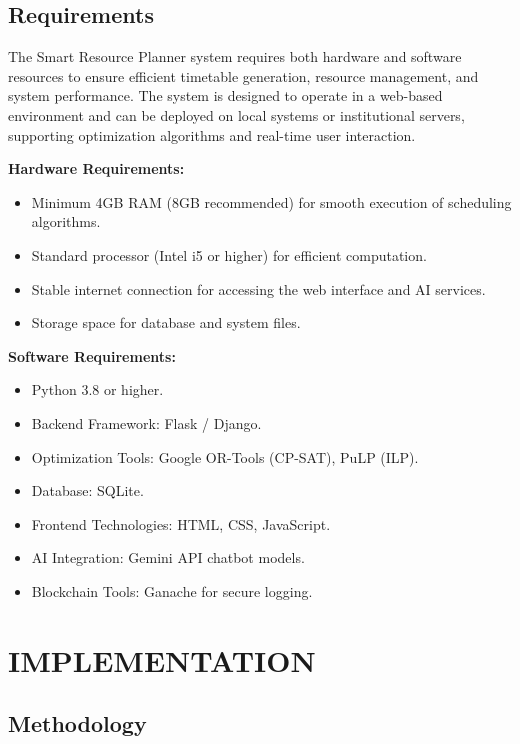 \documentclass[a4paper, 12pt]{report}
\begin{document}
\vspace{1.5em}

\section{Requirements}

\par The Smart Resource Planner system requires both hardware and software resources to ensure efficient timetable generation, resource management, and system performance. The system is designed to operate in a web-based environment and can be deployed on local systems or institutional servers, supporting optimization algorithms and real-time user interaction.

\textbf{Hardware Requirements:}
\begin{itemize}
    \item Minimum 4GB RAM (8GB recommended) for smooth execution of scheduling algorithms.
    \item Standard processor (Intel i5 or higher) for efficient computation.
    \item Stable internet connection for accessing the web interface and AI services.
    \item Storage space for database and system files.
\end{itemize}

\textbf{Software Requirements:}
\begin{itemize}
    \item Python 3.8 or higher.
    \item Backend Framework: Flask / Django.
    \item Optimization Tools: Google OR-Tools (CP-SAT), PuLP (ILP).
    \item Database: SQLite.
    \item Frontend Technologies: HTML, CSS, JavaScript.
    \item AI Integration: Gemini API  chatbot models.
    \item Blockchain Tools: Ganache  for secure logging.
\end{itemize}

\chapter{IMPLEMENTATION}
\section{Methodology}
\end{document}
